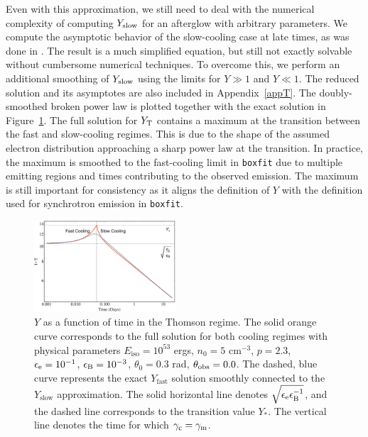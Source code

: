 \documentclass[fleqn,usenatbib]{mnras}
\begin{document}
Even with this approximation, we still need to deal with the numerical complexity of computing $Y_{\rm slow}$ for an afterglow with arbitrary parameters. We compute the asymptotic behavior of the slow-cooling case at late times, as was done in \citet{beniamini}. The result is a much simplified equation, but still not exactly solvable without cumbersome numerical techniques. To overcome this, we perform an additional smoothing of $Y_{\rm slow}$ using the limits for $Y\gg1$ and $Y\ll1$. The reduced solution and its asymptotes are also included in Appendix~\ref{appT}. The doubly-smoothed broken power law is plotted together with the exact solution in Figure~\ref{Yfull}. The full solution for $Y_{\rm T}$ contains a maximum at the transition between the fast and slow-cooling regimes. This is due to the shape of the assumed electron distribution approaching a sharp power law at the transition. In practice, the maximum is smoothed to the fast-cooling limit in \texttt{boxfit} due to multiple emitting regions and times contributing to the observed emission. The maximum is still important for consistency as it aligns the definition of $Y$  with the definition used for synchrotron emission in \texttt{boxfit}.

\begin{figure}
    \includegraphics[width=0.47\textwidth]{images/yt_piece_vs_smooth.pdf}
    \centering\caption{ $Y$ as a function of time in the Thomson regime. The solid orange curve corresponds to the full solution for both cooling regimes with physical parameters $E_{\text{iso}}=10^{53}$ ergs, $n_0=5$ cm${}^{-3}$, $p=2.3$, $\epsilon_{\rm e}=10^{-1}$, $\epsilon_{\rm B}=10^{-3}$, $\theta_0=0.3$ rad, $\theta_{\rm obs}=0.0$.  The dashed, blue curve represents the exact $Y_{\text{fast}}$ solution smoothly connected to the $Y_{\text{slow}}$ approximation. The solid horizontal line denotes $\sqrt{\epsilon_{\rm e}\epsilon_{\rm B}^{-1}}$, and the dashed line corresponds to the transition value $Y_{*}$. The vertical line denotes the time for which $\gamma_{\rm c}= \gamma_{\rm m}$. }
    \label{Yfull}
\end{figure}
\end{document}
